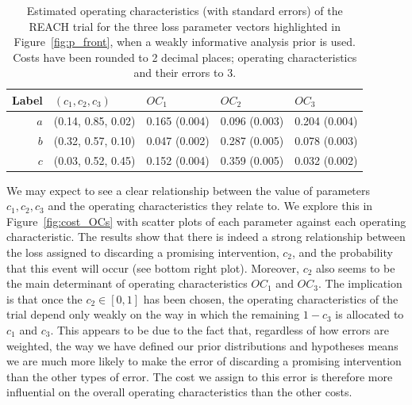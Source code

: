 \documentclass[AMA,STIX1COL]{WileyNJD-v2}
\begin{document}
\begin{table}
\caption{Estimated operating characteristics (with standard errors) of the REACH trial for the three loss parameter vectors highlighted in Figure~\ref{fig:p_front}, when a weakly informative analysis prior is used. Costs have been rounded to 2 decimal places; operating characteristics and their errors to 3.}
\centering
\begin{tabular}{r l l l l}
\toprule
Label & $(c_{1}, c_{2}, c_{3})$ & $OC_{1}$ & $OC_{2}$ & $OC_{3}$ \\
\midrule
$a$ & (0.14, 0.85, 0.02) & 0.165 (0.004) & 0.096 (0.003) & 0.204 (0.004) \\
$b$ & (0.32, 0.57, 0.10) & 0.047 (0.002) & 0.287 (0.005) & 0.078 (0.003)  \\
$c$ & (0.03, 0.52, 0.45) & 0.152 (0.004) & 0.359 (0.005) & 0.032 (0.002)  \\
\bottomrule
\end{tabular}
\label{tab:costs}
\end{table}

We may expect to see a clear relationship between the value of parameters $c_1, c_2, c_3$ and the operating characteristics they relate to. We explore this in Figure~\ref{fig:cost_OCs} with scatter plots of each  parameter against each operating characteristic. The results show that there is indeed a strong relationship between the loss assigned to discarding a promising intervention, $c_2$, and the probability that this event will occur (see bottom right plot). Moreover, $c_2$ also seems to be the main determinant of operating characteristics $OC_1$ and $OC_3$. The implication is that once the $c_2 \in [0,1]$ has been chosen, the operating characteristics of the trial depend only weakly on the way in which the remaining $1-c_3$ is allocated to $c_1$ and $c_3$. This appears to be due to the fact that, regardless of how errors are weighted, the way we have defined our prior distributions and hypotheses means we are much more likely to make the error of discarding a promising intervention than the other types of error. The cost we assign to this error is therefore more influential on the overall operating characteristics than the other costs.
\end{document}
